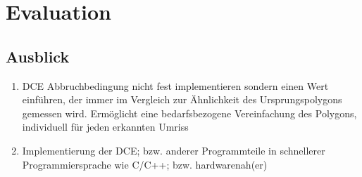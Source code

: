 \chapter{Evaluation}
\label{ch:Evaluation}

\section{Ausblick}
\begin{enumerate}
	\item DCE Abbruchbedingung nicht fest implementieren sondern einen Wert einführen, der immer im Vergleich zur Ähnlichkeit des Ursprungspolygons gemessen wird. Ermöglicht eine bedarfsbezogene Vereinfachung des Polygons, individuell für jeden erkannten Umriss
	\item Implementierung der DCE; bzw. anderer Programmteile in schnellerer Programmiersprache wie C/C++; bzw. hardwarenah(er)
\end{enumerate}



